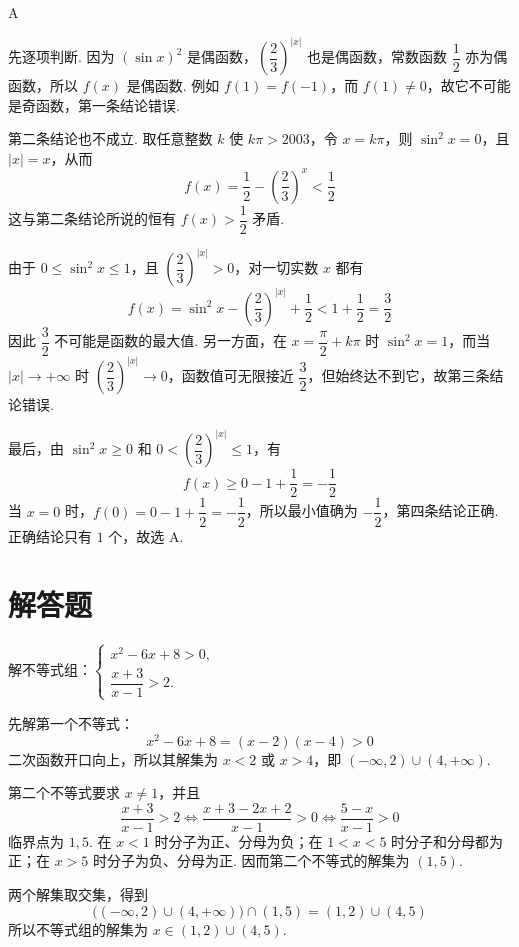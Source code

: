 \begin{answer}
A
\end{answer}

\begin{solution}
先逐项判断. 因为 \((\sin x)^2\) 是偶函数，\(\left(\dfrac{2}{3}\right)^{|x|}\) 也是偶函数，常数函数 \(\dfrac{1}{2}\) 亦为偶函数，所以 \(f(x)\) 是偶函数. 例如 \(f(1)=f(-1)\)，而 \(f(1)\ne0\)，故它不可能是奇函数，第一条结论错误.

第二条结论也不成立. 取任意整数 \(k\) 使 \(k\pi>2003\)，令 \(x=k\pi\)，则 \(\sin^2x=0\)，且 \(|x|=x\)，从而
\[
f(x)=\frac{1}{2}-\left(\frac{2}{3}\right)^x<\frac{1}{2}
\]
这与第二条结论所说的恒有 \(f(x)>\dfrac{1}{2}\) 矛盾.

由于 \(0\leqslant\sin^2x\leqslant1\)，且 \(\left(\dfrac{2}{3}\right)^{|x|}>0\)，对一切实数 \(x\) 都有
\[
f(x)=\sin^2x-\left(\frac{2}{3}\right)^{|x|}+\frac{1}{2}<1+\frac{1}{2}=\frac{3}{2}
\]
因此 \(\dfrac{3}{2}\) 不可能是函数的最大值. 另一方面，在 \(x=\dfrac{\pi}{2}+k\pi\) 时 \(\sin^2x=1\)，而当 \(|x|\to+\infty\) 时 \(\left(\dfrac{2}{3}\right)^{|x|}\to0\)，函数值可无限接近 \(\dfrac{3}{2}\)，但始终达不到它，故第三条结论错误.

最后，由 \(\sin^2x\geqslant0\) 和 \(0<\left(\dfrac{2}{3}\right)^{|x|}\leqslant1\)，有
\[
f(x)\geqslant0-1+\frac{1}{2}=-\frac{1}{2}
\]
当 \(x=0\) 时，\(f(0)=0-1+\dfrac{1}{2}=-\dfrac{1}{2}\)，所以最小值确为 \(-\dfrac{1}{2}\)，第四条结论正确. 正确结论只有 \(1\) 个，故选 A.
\end{solution}

\section{解答题}
\begin{problem}
解不等式组：\(\begin{cases}
x^{2} - 6x + 8 > 0,\\
\dfrac{x + 3}{x - 1} > 2.
\end{cases}\)
\end{problem}

\begin{solution}
先解第一个不等式：
\[
x^2-6x+8=(x-2)(x-4)>0
\]
二次函数开口向上，所以其解集为 \(x<2\) 或 \(x>4\)，即 \((-\infty,2)\cup(4,+\infty)\).

第二个不等式要求 \(x\ne1\)，并且
\[
\frac{x+3}{x-1}>2\Longleftrightarrow\frac{x+3-2x+2}{x-1}>0\Longleftrightarrow\frac{5-x}{x-1}>0
\]
临界点为 \(1,5\). 在 \(x<1\) 时分子为正、分母为负；在 \(1<x<5\) 时分子和分母都为正；在 \(x>5\) 时分子为负、分母为正. 因而第二个不等式的解集为 \((1,5)\).

两个解集取交集，得到
\[
\bigl((-\infty,2)\cup(4,+\infty)\bigr)\cap(1,5)=(1,2)\cup(4,5)
\]
所以不等式组的解集为 \(x\in(1,2)\cup(4,5)\).
\end{solution}

